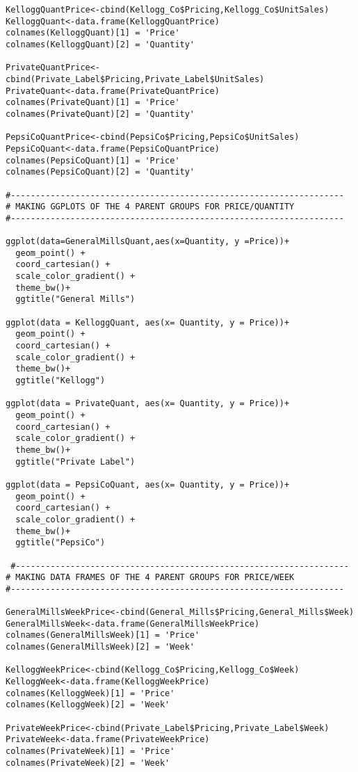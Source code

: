 \documentclass[12pt,english]{article}
\begin{document}
\begin{lstlisting}
KelloggQuantPrice<-cbind(Kellogg_Co$Pricing,Kellogg_Co$UnitSales)
KelloggQuant<-data.frame(KelloggQuantPrice)
colnames(KelloggQuant)[1] = 'Price'
colnames(KelloggQuant)[2] = 'Quantity'

PrivateQuantPrice<-cbind(Private_Label$Pricing,Private_Label$UnitSales)
PrivateQuant<-data.frame(PrivateQuantPrice)
colnames(PrivateQuant)[1] = 'Price'
colnames(PrivateQuant)[2] = 'Quantity'

PepsiCoQuantPrice<-cbind(PepsiCo$Pricing,PepsiCo$UnitSales)
PepsiCoQuant<-data.frame(PepsiCoQuantPrice)
colnames(PepsiCoQuant)[1] = 'Price'
colnames(PepsiCoQuant)[2] = 'Quantity'

#-------------------------------------------------------------------
# MAKING GGPLOTS OF THE 4 PARENT GROUPS FOR PRICE/QUANTITY
#-------------------------------------------------------------------

ggplot(data=GeneralMillsQuant,aes(x=Quantity, y =Price))+
  geom_point() +
  coord_cartesian() +
  scale_color_gradient() +
  theme_bw()+
  ggtitle("General Mills")

ggplot(data = KelloggQuant, aes(x= Quantity, y = Price))+
  geom_point() +
  coord_cartesian() +
  scale_color_gradient() +
  theme_bw()+
  ggtitle("Kellogg")

ggplot(data = PrivateQuant, aes(x= Quantity, y = Price))+
  geom_point() +
  coord_cartesian() +
  scale_color_gradient() +
  theme_bw()+
  ggtitle("Private Label")

ggplot(data = PepsiCoQuant, aes(x= Quantity, y = Price))+
  geom_point() +
  coord_cartesian() +
  scale_color_gradient() +
  theme_bw()+
  ggtitle("PepsiCo")
  
 #-------------------------------------------------------------------
# MAKING DATA FRAMES OF THE 4 PARENT GROUPS FOR PRICE/WEEK
#-------------------------------------------------------------------

GeneralMillsWeekPrice<-cbind(General_Mills$Pricing,General_Mills$Week)
GeneralMillsWeek<-data.frame(GeneralMillsWeekPrice)
colnames(GeneralMillsWeek)[1] = 'Price'
colnames(GeneralMillsWeek)[2] = 'Week'

KelloggWeekPrice<-cbind(Kellogg_Co$Pricing,Kellogg_Co$Week)
KelloggWeek<-data.frame(KelloggWeekPrice)
colnames(KelloggWeek)[1] = 'Price'
colnames(KelloggWeek)[2] = 'Week'

PrivateWeekPrice<-cbind(Private_Label$Pricing,Private_Label$Week)
PrivateWeek<-data.frame(PrivateWeekPrice)
colnames(PrivateWeek)[1] = 'Price'
colnames(PrivateWeek)[2] = 'Week'


\end{lstlisting}
\end{document}
